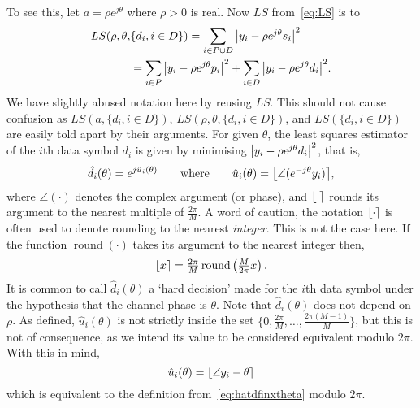 \documentclass[journal]{IEEEtran}
\begin{document}
To see this, let $a = \rho e^{j\theta}$ where $\rho > 0$ is real.  Now $LS$ from~\eqref{eq:LS} is to
\begin{align}
LS(\rho, \theta, &\{d_i, i \in D\}) = \sum_{i \in P \cup D} {\left\vert  y_i - \rho e^{j\theta} s_i  \right\vert}^2  \nonumber \\
&= \sum_{i \in P} {\left\vert  y_i - \rho e^{j\theta} p_i  \right\vert}^2 + \sum_{i \in D} {\left\vert  y_i - \rho e^{j\theta} d_i  \right\vert}^2. \label{eq:LSallparams}
\end{align}
We have slightly abused notation here by reusing $LS$. This should not cause confusion as $LS(a, \{d_i, i \in D\})$, $LS(\rho, \theta, \{d_i, i \in D\})$, and $LS(\{d_i, i \in D\})$ are easily told apart by their arguments.  For given $\theta$, the least squares estimator of the $i$th data symbol $d_i$ is given by minimising ${\left\vert  y_i - \rho e^{j\theta} d_i  \right\vert}^2$, that is,
\begin{equation}\label{eq:hatdfinxtheta}
\hat{d}_i(\theta) = e^{j\hat{u}_i(\theta)} \qquad \text{where} \qquad \hat{u}_i(\theta) = {\left\lfloor \angle( e^{-j\theta}y_i) \right\rceil},
\end{equation}
where $\angle(\cdot)$ denotes the complex argument (or phase), and ${\left\lfloor \cdot \right\rceil}$ rounds its argument to the nearest multiple of $\frac{2\pi}{M}$.  A word of caution, the notation ${\left\lfloor \cdot \right\rceil}$ is often used to denote rounding to the nearest \emph{integer}.  This is not the case here.  If the function $\operatorname{round}(\cdot)$ takes its argument to the nearest integer then,
\[
{\left\lfloor x \right\rceil} = \tfrac{2\pi}{M}\operatorname{round}\left(\tfrac{M}{2\pi}x\right).
\] 
It is common to call $\hat{d}_i(\theta)$ a `hard decision'  made for the $i$th data symbol under the hypothesis that the channel phase is $\theta$.  Note that $\hat{d}_i(\theta)$ does not depend on $\rho$.  As defined, $\hat{u}_i(\theta)$ is not strictly inside the set $\{0, \tfrac{2\pi}{M}, \dots, \tfrac{2\pi(M-1)}{M}\}$, but this is not of consequence, as we intend its value to be considered equivalent modulo $2\pi$.  With this in mind,
\[
\hat{u}_i(\theta) = {\left\lfloor \angle{y_i} - \theta  \right\rceil}
\]
which is equivalent to the definition from~\eqref{eq:hatdfinxtheta} modulo $2\pi$.
\end{document}
